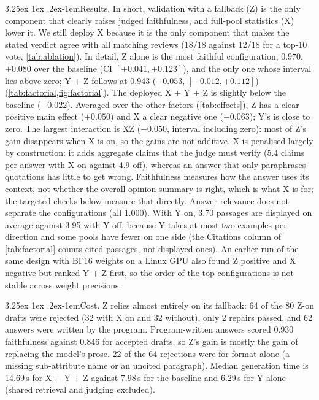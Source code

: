 \documentclass[10pt,twocolumn,a4paper]{article}
\makeatletter
\renewcommand\paragraph{\@startsection{paragraph}{4}{\parindent}%
  {3.25ex \@plus 1ex \@minus .2ex}{-1em}{\normalfont\normalsize\bfseries}}
\makeatother
\begin{document}
\paragraph{Results.} In short, validation with a fallback (Z) is the only component that clearly raises judged
faithfulness, and full-pool statistics (X) lower it. We still deploy X because it is the only component that makes the
stated verdict agree with all matching reviews (18/18 against 12/18 for a top-10 vote, \cref{tab:ablation}).
In detail, Z alone is the most faithful configuration, 0.970, $+0.080$ over the baseline (CI
$[+0.041,+0.123]$), and the only one whose interval lies above zero; Y + Z follows at 0.943 ($+0.053$,
$[-0.012,+0.112]$) (\cref{tab:factorial,fig:factorial}). The deployed X + Y + Z is slightly below the baseline
($-0.022$). Averaged over the other factors (\cref{tab:effects}), Z has a clear positive main effect ($+0.050$) and X a
clear negative one ($-0.063$); Y's is close to zero. The largest interaction is XZ ($-0.050$, interval including zero):
most of Z's gain disappears when X is on, so the gains are not additive. X is penalised largely by construction: it
adds aggregate claims that the judge must verify (5.4 claims per answer with X on against 4.9 off), whereas an answer
that only paraphrases quotations has little to get wrong. Faithfulness measures how the answer uses its context, not
whether the overall opinion summary is right, which is what X is for; the targeted checks below measure that directly.
Answer relevance does not separate the configurations (all 1.000). With Y on, 3.70 passages are displayed on average
against 3.95 with Y off, because Y takes at most two examples per direction and some pools have fewer on one side
(the Citations column of \cref{tab:factorial} counts cited passages, not displayed ones). An earlier run of the same design with BF16 weights on a Linux GPU
also found Z positive and X negative but ranked Y + Z first, so the order of the top configurations is not stable
across weight precisions.

\paragraph{Cost.} Z relies almost entirely on its fallback: 64 of the 80 Z-on drafts were rejected (32 with X on and 32
without), only 2 repairs passed, and 62 answers were written by the program. Program-written answers scored 0.930
faithfulness against 0.846 for accepted drafts, so Z's gain is mostly the gain of replacing the model's prose. 22 of
the 64 rejections were for format alone (a missing sub-attribute name or an uncited paragraph). Median generation time
is 14.69\,s for X + Y + Z against 7.98\,s for the baseline and 6.29\,s for Y alone (shared retrieval and judging
excluded).
\end{document}
